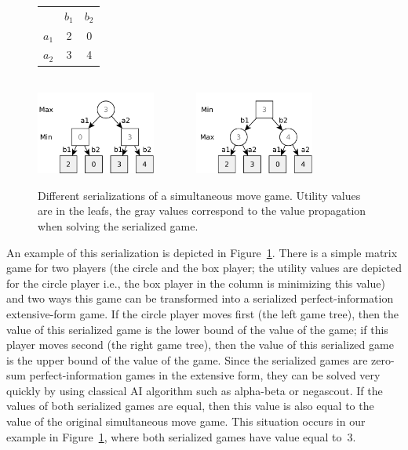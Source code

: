 \begin{figure}
\centering
\begin{tabular}{l|c|c|}
 \multicolumn{1}{c}{~} & \multicolumn{1}{c}{$b_1$}  &  \multicolumn{1}{c}{$b_2$}\\\cline{2-3}
$a_1$ &  2  &  0\\\cline{2-3}
$a_2$ &  3  &  4\\\cline{2-3}
\end{tabular}
\\\vspace{0.5cm}
\includegraphics[width=0.35\textwidth]{figures/serialization1.pdf}~~~~~~~
\includegraphics[width=0.35\textwidth]{figures/serialization2.pdf}
\caption{Different serializations of a simultaneous move game. Utility values are in the leafs, the gray values correspond to the value propagation when solving the serialized game.}\label{fig:serialization}
\end{figure}

An example of this serialization is depicted in Figure~\ref{fig:serialization}. 
There is a simple matrix game for two players (the circle and the box player; the utility values are depicted for the circle player i.e., the box player in the column is minimizing this value) and two ways this game can be transformed into a serialized perfect-information extensive-form game.
If the circle player moves first (the left game tree), then the value of this serialized game is the lower bound of the value of the game; if this player moves second (the right game tree), then the value of this serialized game is the upper bound of the value of the game.
Since the serialized games are zero-sum perfect-information games in the extensive form, they can be solved very quickly by using classical AI algorithm such as alpha-beta or negascout.
If the values of both serialized games are equal, then this value is also equal to the value of the original simultaneous move game. 
This situation occurs in our example in Figure~\ref{fig:serialization}, where both serialized games have value equal to~$3$.

